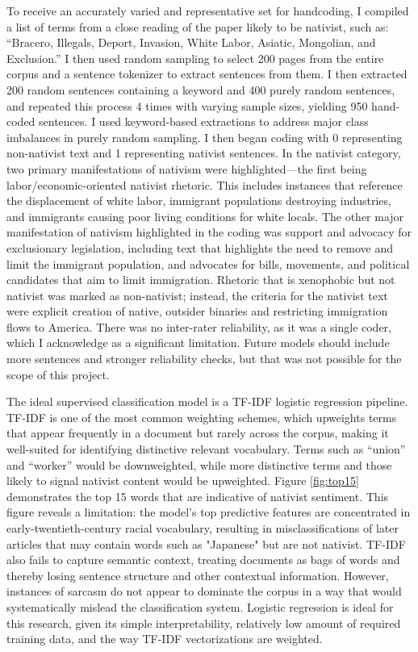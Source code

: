 \documentclass[12pt,a4paper]{article}
\begin{document}
\vspace*{0.5cm}

To receive an accurately varied and representative set for handcoding, I compiled a list of terms from a close reading of the paper likely to be nativist, such as: ``Bracero, Illegals, Deport, Invasion, White Labor, Asiatic, Mongolian, and Exclusion.'' I then used random sampling to select 200 pages from the entire corpus and a sentence tokenizer to extract sentences from them. I then extracted 200 random sentences containing a keyword and 400 purely random sentences, and repeated this process 4 times with varying sample sizes, yielding 950 hand-coded sentences. I used keyword-based extractions to address major class imbalances in purely random sampling. I then began coding with 0 representing non-nativist text and 1 representing nativist sentences. In the nativist category, two primary manifestations of nativism were highlighted---the first being labor/economic-oriented nativist rhetoric. This includes instances that reference the displacement of white labor, immigrant populations destroying industries, and immigrants causing poor living conditions for white locals. The other major manifestation of nativism highlighted in the coding was support and advocacy for exclusionary legislation, including text that highlights the need to remove and limit the immigrant population, and advocates for bills, movements, and political candidates that aim to limit immigration. Rhetoric that is xenophobic but not nativist was marked as non-nativist; instead, the criteria for the nativist text were explicit creation of native, outsider binaries and restricting immigration flows to America. There was no inter-rater reliability, as it was a single coder, which I acknowledge as a significant limitation. Future models should include more sentences and stronger reliability checks, but that was not possible for the scope of this project. 


The ideal supervised classification model is a TF-IDF logistic regression pipeline. TF-IDF is one of the most common weighting schemes, which upweights terms that appear frequently in a document but rarely across the corpus, making it well-suited for identifying distinctive relevant vocabulary. Terms such as ``union'' and ``worker'' would be downweighted, while more distinctive terms and those likely to signal nativist content would be upweighted. Figure \ref{fig:top15} demonstrates the top 15 words that are indicative of nativist sentiment. This figure reveals a limitation: the model's top predictive features are concentrated in early-twentieth-century racial vocabulary, resulting in misclassifications of later articles that may contain words such as "Japanese" but are not nativist. TF-IDF also fails to capture semantic context, treating documents as bags of words and thereby losing sentence structure and other contextual information. However, instances of sarcasm do not appear to dominate the corpus in a way that would systematically mislead the classification system. Logistic regression is ideal for this research, given its simple interpretability, relatively low amount of required training data, and the way TF-IDF vectorizations are weighted.
\end{document}
